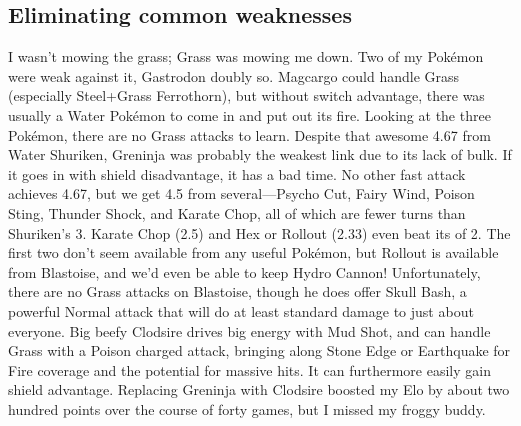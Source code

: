 \subsection{Eliminating common weaknesses\label{subsec:eliminatingweak}}
I wasn't mowing the grass; Grass was mowing me down.
Two of my Pokémon were weak against it, Gastrodon doubly so.
Magcargo could handle Grass (especially Steel+Grass Ferrothorn), but
 without switch advantage, there was usually a Water Pokémon to come
 in and put out its fire.
Looking at the three Pokémon, there are no Grass attacks to learn.
Despite that awesome 4.67 \EPT{} from Water Shuriken, Greninja was probably
  the weakest link due to its lack of bulk.
If it goes in with shield disadvantage, it has a bad time.
No other fast attack achieves 4.67, but we get 4.5 from several---Psycho
  Cut, Fairy Wind, Poison Sting, Thunder Shock, and Karate Chop,
  all of which are fewer turns than Shuriken's 3.
Karate Chop (2.5) and Hex or Rollout (2.33) even beat its \PPT{} of 2.
The first two don't seem available from any useful Pokémon, but
  Rollout is available from Blastoise, and we'd even be able to
  keep Hydro Cannon!
Unfortunately, there are no Grass attacks on Blastoise, though
  he does offer Skull Bash, a powerful Normal attack that
  will do at least standard damage to just about everyone.
Big beefy Clodsire drives big energy with Mud Shot, and can handle
  Grass with a Poison charged attack, bringing along Stone Edge
  or Earthquake for Fire coverage and the potential for massive hits.
It can furthermore easily gain shield advantage.
Replacing Greninja with Clodsire boosted my Elo by about two hundred points
 over the course of forty games, but I missed my froggy buddy.
